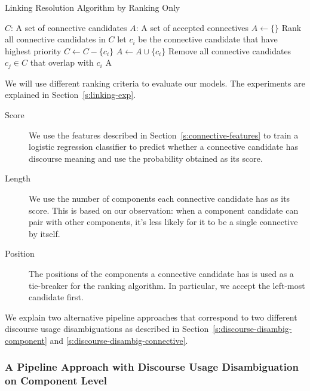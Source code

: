 \begin{algorithm}
    \caption{Linking Resolution Algorithm by Ranking Only}
    \label{a:linking-rank}
    \begin{algorithmic}[1]
        \Require
            $C$: A set of connective candidates
        \Ensure
            $A$: A set of accepted connectives
        \State $A \gets \{\}$
        \State Rank all connective candidates in $ C $
            \State let $ c_i $ be the connective candidate that have highest priority
            \State $C \gets C - \{c_i\}$
            \State $A \gets A \cup \{c_i\}$
            \State Remove all connective candidates $ c_j \in C $ that overlap with $ c_i $
        \EndWhile
        \State \Return A
    \end{algorithmic}
\end{algorithm}

We will use different ranking criteria to evaluate our models. The experiments are
explained in Section~\ref{s:linking-exp}.

\begin{description}
\item[Score] We use the features described in Section~\ref{s:connective-features} to
    train a logistic regression classifier to predict whether a connective candidate
    has discourse meaning and use the probability obtained as its score.

\item[Length] We use the number of components each connective candidate has as its
    score. This is based on our observation: when a component candidate can
    pair with other components, it's less likely for it to be a single connective by
    itself.

\item[Position] The positions of the components a connective candidate has is used
    as a tie-breaker for the ranking algorithm. In particular, we accept the left-most
    candidate first.
\end{description}

We explain two alternative pipeline approaches that correspond to two different
discourse usage disambiguations as described in Section~\ref{s:discourse-disambig-component}
and \ref{s:discourse-disambig-connective}.

\subsubsection{A Pipeline Approach with Discourse Usage Disambiguation on Component Level}
\label{s:pipeline1}

